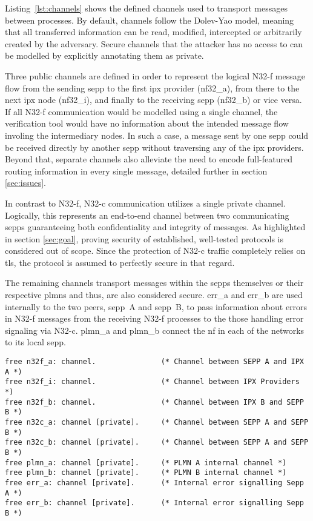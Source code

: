 Listing~\ref{lst:channels} shows the defined channels used to transport messages between processes.
By default, channels follow the Dolev-Yao model, meaning that all transferred information can be read, modified, intercepted or arbitrarily created by the adversary.
Secure channels that the attacker has no access to can be modelled by explicitly annotating them as private.

Three public channels are defined in order to represent the logical N32-f message flow from the sending \gls{sepp} to the first \gls{ipx} provider ({\sffamily nf32\_a}), from there to the next \gls{ipx} node ({\sffamily nf32\_i}), and finally to the receiving \gls{sepp} ({\sffamily nf32\_b}) or vice versa.
If all N32-f communication would be modelled using a single channel, the verification tool would have no information about the intended message flow involing the intermediary nodes.
In such a case, a message sent by one \gls{sepp} could be received directly by another \gls{sepp} without traversing any of the \gls{ipx} providers.
Beyond that, separate channels also alleviate the need to encode full-featured routing information in every single message, detailed further in section \ref{sec:issues}.

In contrast to N32-f, N32-c communication utilizes a single private channel.
Logically, this represents an end-to-end channel between two communicating \glspl{sepp} guaranteeing both confidentiality and integrity of messages.
As highlighted in section \ref{sec:goal}, proving security of established, well-tested protocols is considered out of scope.
Since the protection of N32-c traffic completely relies on \gls{tls}, the protocol is assumed to perfectly secure in that regard.

The remaining channels transport messages within the \glspl{sepp} themselves or their respective \glspl{plmn} and thus, are also considered secure.
{\sffamily err\_a} and {\sffamily err\_b} are used internally to the two peers, \gls{sepp}~A and \gls{sepp}~B, to pass information about errors in N32-f messages from the receiving N32-f processes to the those handling error signaling via N32-c.
{\sffamily plmn\_a} and {\sffamily plmn\_b} connect the \gls{nf} in each of the networks to its local \gls{sepp}.

\begin{lstlisting}[caption={Custom channel declarations},label={lst:channels},firstnumber=23]
free n32f_a: channel.               (* Channel between SEPP A and IPX A *)
free n32f_i: channel.               (* Channel between IPX Providers *)
free n32f_b: channel.               (* Channel between IPX B and SEPP B *)
free n32c_a: channel [private].     (* Channel between SEPP A and SEPP B *)
free n32c_b: channel [private].     (* Channel between SEPP A and SEPP B *)
free plmn_a: channel [private].     (* PLMN A internal channel *)
free plmn_b: channel [private].     (* PLMN B internal channel *)
free err_a: channel [private].      (* Internal error signalling Sepp A *)
free err_b: channel [private].      (* Internal error signalling Sepp B *)
\end{lstlisting}

